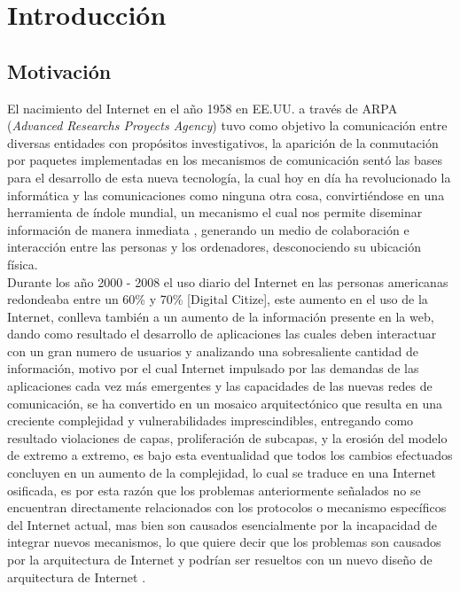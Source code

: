 \documentclass[12pt]{ociamthesis}  %
\begin{document}
\begin{romanpages}          %
\tableofcontents            %
\listoffigures              %
\end{romanpages}            %

\chapter{Introducción}
\section{Motivación}

El nacimiento del Internet en el año 1958 en EE.UU. a través de ARPA (\textit{Advanced Researchs Proyects Agency}) tuvo como objetivo la comunicación entre diversas entidades con propósitos investigativos, la aparición de la conmutación por paquetes implementadas en los mecanismos de comunicación sentó las bases para el desarrollo de esta nueva tecnología, la cual hoy en día ha revolucionado la informática y las comunicaciones como ninguna otra cosa, convirtiéndose en una herramienta de índole mundial, un mecanismo el cual nos permite diseminar información de manera inmediata , generando un medio de colaboración e interacción entre las personas y los ordenadores, desconociendo su ubicación física.\\

Durante los año 2000 - 2008 el uso diario del Internet en las personas americanas redondeaba entre un 60\% y 70\% [Digital Citize], este aumento en el uso de la Internet, conlleva también a un aumento de la información presente en la web, dando como resultado el desarrollo de aplicaciones las cuales deben interactuar con un gran numero de usuarios y analizando una sobresaliente cantidad de información, motivo por el cual Internet impulsado por las demandas de las aplicaciones cada vez más emergentes y las capacidades de las nuevas redes de comunicación, se ha convertido en un mosaico arquitectónico que resulta en una creciente complejidad y vulnerabilidades imprescindibles, entregando como resultado violaciones de capas, proliferación de subcapas, y la erosión del modelo de extremo a extremo, es bajo esta eventualidad que todos los cambios efectuados concluyen en un aumento de la complejidad, lo cual se traduce en una Internet osificada, es por esta razón que los problemas anteriormente señalados no se encuentran directamente relacionados con los protocolos o mecanismo específicos del Internet actual, mas bien son causados esencialmente por la incapacidad de integrar nuevos mecanismos, lo que quiere decir que los problemas son causados por la arquitectura de Internet y podrían ser resueltos con un nuevo diseño de arquitectura de Internet \cite{muller2009future}.\\
\end{document}
